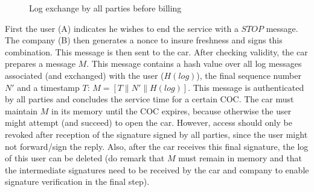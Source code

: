 \begin{figure}[!ht]
  \renewcommand{\Bx}{7}
  \renewcommand{\Cx}{14}
  \setcounter{CC}{0}
  \centering
  \caption{Log exchange by all parties before billing}
  \label{FinalLogExchange}
\end{figure}

First the user (A) indicates he wishes to end the service with a $STOP$ message. The company (B) then generates a nonce to insure freshness and signs this combination. This message is then sent to the car. After checking validity, the car prepares a message $M$. This message contains a hash value over all log messages associated (and exchanged) with the user ($H(log)$), the final sequence number $N'$ and a timestamp $T$: $M=[T \parallel N' \parallel H(log)]$. This message is authenticated by all parties and concludes the service time for a certain COC. The car must maintain $M$ in its memory until the COC expires, because otherwise the user might attempt (and succeed) to open the car. However, access should only be revoked after reception of the signature signed by all parties, since the user might not forward/sign the reply. Also, after the car receives this final signature, the log of this user can be deleted (do remark that $M$ must remain in memory and that the intermediate signatures need to be received by the car and company to enable signature verification in the final step).
